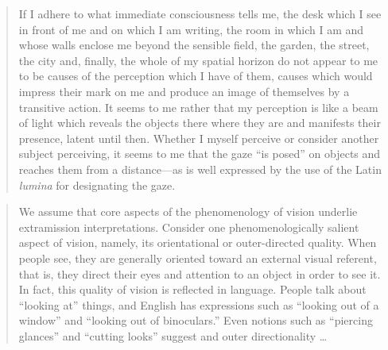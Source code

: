 \begin{quote}
	If I adhere to what immediate consciousness tells me, the desk which I see in front of me and on which I am writing, the room in which I am and whose walls enclose me beyond the sensible field, the garden, the street, the city and, finally, the whole of my spatial horizon do not appear to me to be causes of the perception which I have of them, causes which would impress their mark on me and produce an image of themselves by a transitive action. It seems to me rather that my perception is like a beam of light which reveals the objects there where they are and manifests their presence, latent until then. Whether I myself perceive or consider another subject perceiving, it seems to me that the gaze ``is posed'' on objects and reaches them from a distance---as is well expressed by the use of the Latin \emph{lumina} for designating the gaze. \citep[185]{Merleau-Ponty:1967fj}
\end{quote}


\begin{quote}
	We assume that core aspects of the phenomenology of vision underlie extramission interpretations. Consider one phenomenologically salient aspect of vision, namely, its orientational or outer-directed quality. When people see, they are generally oriented toward an external visual referent, that is, they direct their eyes and attention to an object in order to see it. In fact, this quality of vision is reflected in language. People talk about ``looking at'' things, and English has expressions such as ``looking out of a window'' and ``looking out of binoculars.'' Even notions such as ``piercing glances'' and ``cutting looks'' suggest and outer directionality \ldots\ \citep[140]{Winer:1996as}
\end{quote}


